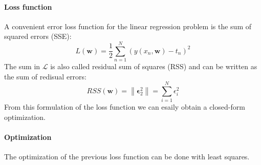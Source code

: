\paragraph*{Loss function}
A convenient error loss function for the linear regression problem is the sum of squared errors (SSE): 
\[L(\textbf{w})=\dfrac{1}{2}\sum_{n=1}^{N}\left( y(x_n, \textbf{w})-t_n \right)^2\]
The sum in $\mathcal{L}$ is also called residual sum of squares (RSS) and can be written as the sum of redisual errors: 
\[RSS(\textbf{w})=\left\lVert \boldsymbol{\epsilon}^2_2 \right\rVert = \sum_{i=1}^{N}\epsilon^2_i \]
From this formulation of the loss function we can esaily obtain a closed-form optimization. 

\paragraph*{Optimization}
The optimization of the previous loss function can be done with least squares. 








